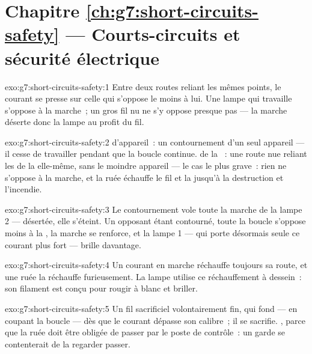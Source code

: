 \section*{Chapitre \ref{ch:g7:short-circuits-safety} --- Courts-circuits et sécurité électrique}

\begin{solution}{exo:g7:short-circuits-safety:1}
Entre deux routes reliant les mêmes points, le courant se presse sur
celle qui s'oppose le moins à lui. Une lampe qui travaille s'oppose à
la marche~; un gros fil nu ne s'y oppose presque pas --- la marche
déserte donc la lampe au profit du fil.
\end{solution}

\begin{solution}{exo:g7:short-circuits-safety:2}
 d'appareil~: un contournement d'un seul appareil ---
il cesse de travailler pendant que la boucle continue. 
de la ~: une route nue reliant les  de la  elle-même,
sans le moindre appareil --- le cas le plus grave~: rien ne s'oppose
à la marche, et la ruée échauffe le fil et la  jusqu'à la
destruction et l'incendie.
\end{solution}

\begin{solution}{exo:g7:short-circuits-safety:3}
Le contournement vole toute la marche de la lampe 2 --- désertée,
elle s'éteint. Un opposant étant contourné, toute la boucle s'oppose
moins à la , la marche se renforce, et la lampe 1 --- qui porte
désormais seule ce courant plus fort --- brille davantage.
\end{solution}

\begin{solution}{exo:g7:short-circuits-safety:4}
Un courant en marche réchauffe toujours sa route, et une ruée la
réchauffe furieusement. La lampe utilise ce réchauffement à dessein~:
son filament est conçu pour rougir à blanc et briller.
\end{solution}

\begin{solution}{exo:g7:short-circuits-safety:5}
Un fil sacrificiel volontairement fin, qui fond --- en coupant la
boucle --- dès que le courant dépasse son calibre~; il se sacrifie.
, parce que la ruée doit être obligée de passer par le poste
de contrôle~: un garde  se contenterait de la regarder
passer.
\end{solution}

